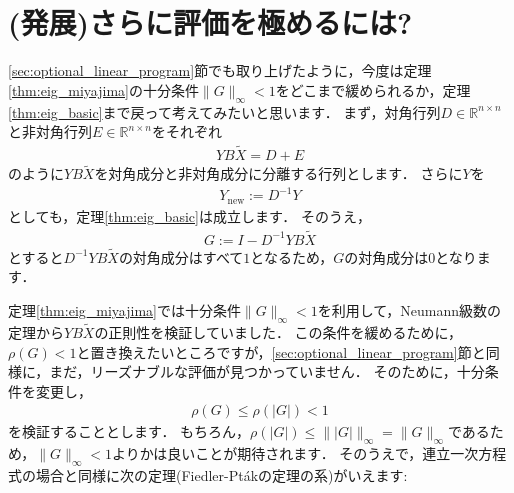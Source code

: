 \section{(発展)さらに評価を極めるには?}\label{sec:optional_eig_program}
\ref{sec:optional_linear_program}節でも取り上げたように，今度は定理\ref{thm:eig_miyajima}の十分条件$\| G \|_{\infty} < 1$をどこまで緩められるか，定理\ref{thm:eig_basic}まで戻って考えてみたいと思います．
まず，対角行列$D \in {\mathbb R}^{n \times n}$と非対角行列$E  \in {\mathbb R}^{n \times n}$をそれぞれ
	\begin{align*}
		Y B \tilde{X} = D + E
	\end{align*}
のように$Y B \tilde{X}$を対角成分と非対角成分に分離する行列とします．
さらに$Y$を
	\begin{align*}
		Y_{\mbox{new}} := D^{-1} Y
	\end{align*}
としても，定理\ref{thm:eig_basic}は成立します．
そのうえ，
	\begin{align*}
		G := I - D^{-1} Y B \tilde{X}
	\end{align*}
とすると$D^{-1} Y B \tilde{X}$の対角成分はすべて$1$となるため，$G$の対角成分は$0$となります．


定理\ref{thm:eig_miyajima}では十分条件$\| G \|_{\infty} < 1$を利用して，Neumann級数の定理から$Y B \tilde{X}$の正則性を検証していました．
この条件を緩めるために，$\rho(G) < 1$と置き換えたいところですが，\ref{sec:optional_linear_program}節と同様に，まだ，リーズナブルな評価が見つかっていません．
そのために，十分条件を変更し，
	\begin{align*}
		\rho(G) \le \rho( |G| ) < 1
	\end{align*}
を検証することとします．
もちろん，$\rho( |G| ) \le \| |G| \|_{\infty} = \| G \|_{\infty}$であるため，$\| G \|_{\infty} < 1$よりかは良いことが期待されます．
そのうえで，連立一次方程式の場合と同様に次の定理(Fiedler-Pt\'akの定理の系)がいえます:

